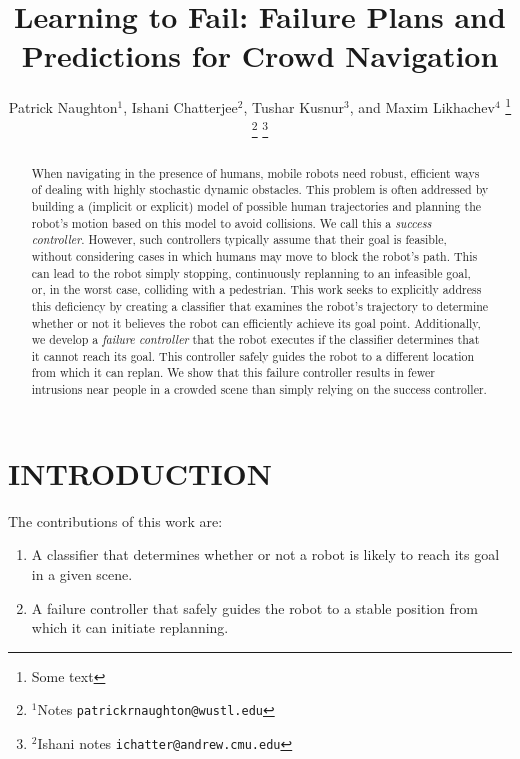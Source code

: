 \documentclass[letterpaper, 10 pt, conference]{ieeeconf}  %
\title{\LARGE \bf
	Learning to Fail: Failure Plans and Predictions for Crowd Navigation
}
\author{Patrick Naughton$^{1}$, Ishani Chatterjee$^{2}$, Tushar Kusnur$^{3}$, and Maxim Likhachev$^{4}$%
\thanks{Some text}%
\thanks{$^{1}$Notes
        {\tt\small patrickrnaughton@wustl.edu}}%
\thanks{$^{2}$Ishani notes
        {\tt\small ichatter@andrew.cmu.edu}}%
}
\begin{document}
\maketitle
\thispagestyle{empty}
\pagestyle{empty}


\begin{abstract}
	When navigating in the presence of humans, mobile robots need robust, efficient ways of dealing with highly stochastic dynamic obstacles. This problem is often addressed by building a (implicit or explicit) model of possible human trajectories and planning the robot's motion based on this model to avoid collisions. We call this a \textit{success controller}. However, such controllers typically assume that their goal is feasible, without considering cases in which humans may move to block the robot's path. This can lead to the robot simply stopping, continuously replanning to an infeasible goal, or, in the worst case, colliding with a pedestrian. This work seeks to explicitly address this deficiency by creating a classifier that examines the robot's trajectory to determine whether or not it believes the robot can efficiently achieve its goal point. Additionally, we develop a \textit{failure controller} that the robot executes if the classifier determines that it cannot reach its goal. This controller safely guides the robot to a different location from which it can replan. We show that this failure controller results in fewer intrusions near people in a crowded scene than simply relying on the success controller.
\end{abstract}


\section{INTRODUCTION}

	The contributions of this work are:
	\begin{enumerate}
		\item A classifier that determines whether or not a robot is likely to reach its goal in a given scene.
		\item A failure controller that safely guides the robot to a stable position from which it can initiate replanning.
	\end{enumerate}
	
\end{document}
